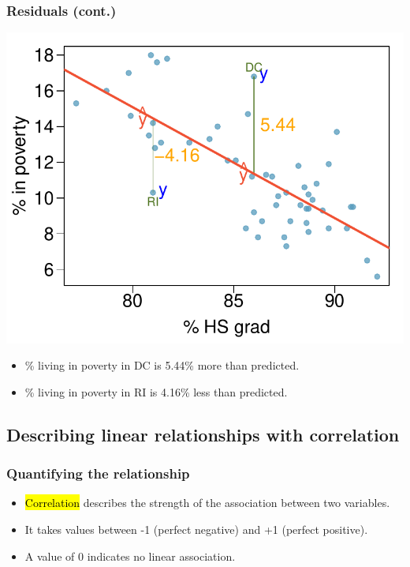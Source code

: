 \begin{frame}
\frametitle{Residuals (cont.)}

\vspace{-0.5cm}
{
\begin{center}
\includegraphics[width=\textwidth]{8-2_least_square_reg/figures/poverty/poverty_hsgrad_res_text}
\end{center}
}
{
\pause
\begin{itemize}
\item \% living in poverty in DC is 5.44\% more than predicted.
\pause
\item \% living in poverty in RI is 4.16\% less than predicted.
\end{itemize}
}


\end{frame}


\subsection{Describing linear relationships with correlation}


\begin{frame}
\frametitle{Quantifying the relationship}

\begin{itemize}

\item \hl{Correlation} describes the strength of the  association between two variables.

\pause

\item It takes values between -1 (perfect negative) and +1 (perfect positive).

\pause

\item A value of 0 indicates no linear association.

\end{itemize}

\end{frame}

